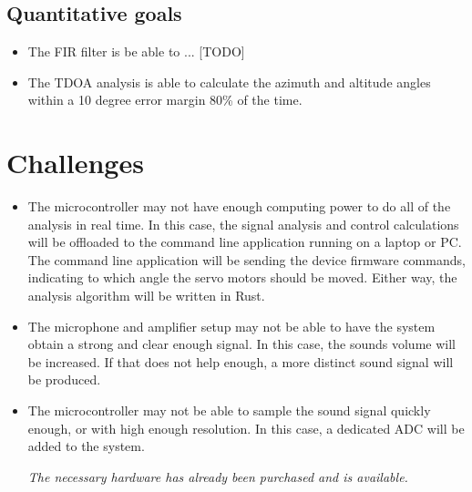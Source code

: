 \documentclass[a4paper]{article}
\begin{document}
\subsection{Quantitative goals}
\begin{itemize}
    \item The FIR filter is be able to ... [TODO]
    \item The TDOA analysis is able to calculate the azimuth and altitude angles within a 10 degree error margin 80\% of the time.
\end{itemize}

\section{Challenges}
\begin{itemize}
    \item The microcontroller may not have enough computing power to do all of the analysis in real time. In this case, the signal analysis and control calculations will be offloaded to the command line application running on a laptop or PC. The command line application will be sending the device firmware commands, indicating to which angle the servo motors should be moved. Either way, the analysis algorithm will be written in Rust.
    \item The microphone and amplifier setup may not be able to have the system obtain a strong and clear enough signal. In this case, the sounds volume will be increased. If that does not help enough, a more distinct sound signal will be produced.
    \item The microcontroller may not be able to sample the sound signal quickly enough, or with high enough resolution. In this case, a dedicated ADC will be added to the system.
    
\textit{The necessary hardware has already been purchased and is available.}

\end{itemize}
\end{document}
